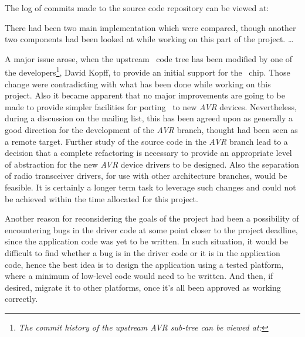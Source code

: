   The log of commits made to the source code repository can be viewed at:


  There had been two main implementation which were compared, though
 another two components had been looked at while working on this part
 of the project. \dots %

  A major issue arose, when the upstream \Contiki\ code tree has been
 modified by one of the developers\footnote{\emph{The commit history of
 the upstream AVR sub-tree can be viewed at:}
 },
 David Kopff, to provide an initial support for the \RFA\ chip. Those
 change were contradicting with what has been done while working on this
 project. Also it became apparent that no major improvements are going
 to be made to provide simpler facilities for porting \Contiki\ to new
 \emph{AVR} devices.
 Nevertheless, during a discussion on the mailing list, this has been
 agreed upon as generally a good direction for the development of the
 \emph{AVR} branch, thought had been seen as a remote target. Further
 study of the source code in the \emph{AVR} branch lead to a decision
 that a complete refactoring is necessary to provide an appropriate
 level of abstraction for the new \emph{AVR} device drivers to be
 designed. Also the separation of radio transceiver drivers, for use
 with other architecture branches, would be feasible. It is certainly
 a longer term task to leverage such changes and could not be achieved
 within the time allocated for this project.

  Another reason for reconsidering the goals of the project had been
 a possibility of encountering bugs in the driver code at some point
 closer to the project deadline, since the application code was yet to
 be written. In such situation, it would be difficult to find whether
 a bug is in the driver code or it is in the application code, hence
 the best idea is to design the application using a tested platform,
 where a minimum of low-level code would need to be written. And then,
 if desired, migrate it to other platforms, once it's all been approved
 as working correctly.

